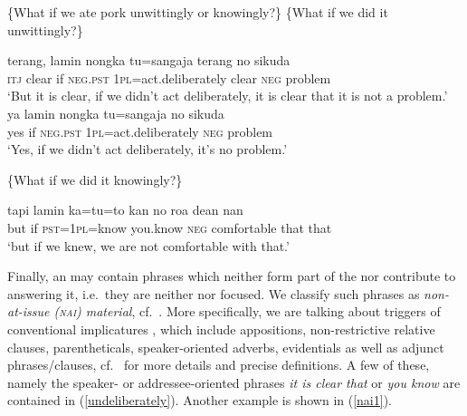 \documentclass[output=paper
,modfonts
,nonflat]{langsci/langscibook}
\begin{document}
\begin{exe}
	\ex \label{undeliberately}
	\begin{xlist}
		 \{What if we ate pork unwittingly or knowingly?\}
		 \{What if we did it unwittingly?\}
	\end{xlist}
	\begin{xlist}[≫ A\textsubscript{{3.1+}}:]
		\exi{≫ A\textsubscript{{3.1}}:}
		 {terang,{\cb}\nai} {{\ob}{\ob}lamin} nongka {tu=sangaja{\cb}\ctopic} {{\ob}terang{\cb}\nai} {{\ob}no} {sikuda{\cb}\focus{\cb}\sq}\\
		{\hphantom{[}\textsc{itj}} clear \hphantom{[[}if \textsc{neg}.\textsc{pst} \textsc{1pl}=act.deliberately \hphantom{[}clear \hphantom{[}\textsc{neg} problem\\
		\glt `But it is clear, if we didn’t act deliberately, it is clear that it is not a problem.’
		\exi{Speaker I:\hfill}
		\exi{≫ A\textsubscript{{3.1+}}:}
		\gll ya {{\ob}{\ob}lamin} nongka {tu=sangaja{\cb}\ctopic} {{\ob}no} {sikuda{\cb}\focus{\cb}\sq}\\
		yes \hphantom{[[}if \textsc{neg}.\textsc{pst} \textsc{1pl}=act.deliberately \hphantom{[}\textsc{neg} problem\\
		\glt `Yes, if we didn’t act deliberately, it’s no problem.’
	\end{xlist}
	\begin{xlist}
		 \{What if we did it knowingly?\}
	\end{xlist}
	\begin{xlist}[≫ A\textsubscript{{3.1+}}:]
		\exi{≫ A\textsubscript{{3.2}}:}
		\gll tapi {{\ob}{\ob}lamin} {ka=tu=to{\cb}\ctopic} {{\ob}kan{\cb}\nai} {{\ob}no} {roa{\cb}\focus} {{\ob}dean} {nan{\cb}\topic{\cb}\sq}\\
		but \hphantom{[[}if \textsc{pst}=\textsc{1pl}=know \hphantom{[}you.know \hphantom{[}\textsc{neg} comfortable \hphantom{[}that that\\
		\glt `but if we knew, we are not comfortable with that.’
	\end{xlist}
\end{exe}

\noindent Finally, an  may contain phrases which neither form part of the  nor contribute to answering it, i.e.\ they are neither  nor focused. We classify such phrases as \textit{non-at-issue \textsc{(nai)} material}, cf.\ \citet{tonju13,andsc15}. More specifically, we are talking about triggers of conventional implicatures \citep{potch05}, which include appositions, non-restrictive relative clauses, parentheticals, speaker-oriented adverbs, evidentials as well as adjunct phrases/clauses, cf.\ \citet{riear17b} for more details and precise definitions. A few of these, namely the speaker- or addressee-oriented phrases \textit{it is clear that} or \textit{you know} are contained in (\ref{undeliberately}). Another example is shown in (\ref{nai1}). 
\end{document}
